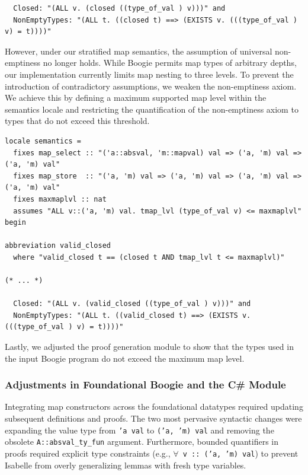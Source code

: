 \documentclass[11pt]{article}
\begin{document}
\begin{verbatim}
  Closed: "(ALL v. (closed ((type_of_val ) v)))" and 
  NonEmptyTypes: "(ALL t. ((closed t) ==> (EXISTS v. (((type_of_val ) v) = t))))" 
\end{verbatim}

However, under our stratified map semantics, the assumption of universal non-emptiness no longer holds.
While Boogie permits map types of arbitrary depths, our implementation currently limits map nesting to three levels.
To prevent the introduction of contradictory assumptions, we weaken the non-emptiness axiom.
We achieve this by defining a maximum supported map level within the semantics locale
and restricting the quantification of the non-emptiness axiom to types that do not exceed this threshold.


\begin{verbatim}
locale semantics =
  fixes map_select :: "('a::absval, 'm::mapval) val => ('a, 'm) val => ('a, 'm) val"
  fixes map_store  :: "('a, 'm) val => ('a, 'm) val => ('a, 'm) val => ('a, 'm) val"
  fixes maxmaplvl :: nat
  assumes "ALL v::('a, 'm) val. tmap_lvl (type_of_val v) <= maxmaplvl"
begin

abbreviation valid_closed
  where "valid_closed t == (closed t AND tmap_lvl t <= maxmaplvl)"

(* ... *)

  Closed: "(ALL v. (valid_closed ((type_of_val ) v)))" and 
  NonEmptyTypes: "(ALL t. ((valid_closed t) ==> (EXISTS v. (((type_of_val ) v) = t))))" 
\end{verbatim}

Lastly, we adjusted the proof generation module to show that the types used in the input Boogie program do not exceed the maximum map level.


\subsubsection{Adjustments in Foundational Boogie and the C\# Module}
\label{sec:adjust-foundational}

Integrating map constructors across the foundational datatypes required updating subsequent definitions and proofs.
The two most pervasive syntactic changes were expanding the value type from \texttt{'a val} to \texttt{('a, 'm) val}
and removing the obsolete \texttt{A::absval\_ty\_fun} argument.
Furthermore, bounded quantifiers in proofs required explicit type constraints (e.g., \texttt{$\forall$ v :: ('a, 'm) val})
to prevent Isabelle from overly generalizing lemmas with fresh type variables.
\end{document}
